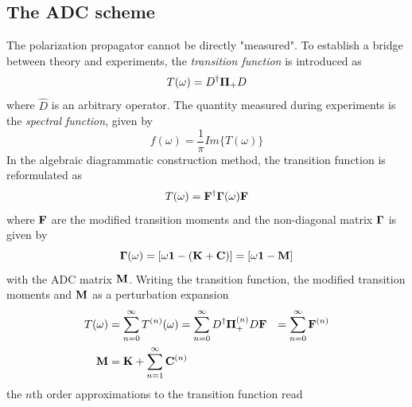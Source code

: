 \subsection{The ADC scheme}

The polarization propagator cannot be directly "measured". To establish a bridge between theory and experiments, the \emph{transition function} is introduced as
\begin{equation}
T(\omega) = D^{\dagger} \boldsymbol{\Pi}_{+} D 
\end{equation}
\noindent where $\hat{D}$ is an arbitrary operator. The quantity measured during experiments is the \emph{spectral function}, given by
\begin{equation}
f(\omega) = \frac{1}{\pi}Im\{T(\omega)\}
\end{equation}
In the algebraic diagrammatic construction method, the transition function is reformulated as
\begin{equation}
T(\omega) = \mathbf{F}^{\dagger} \mathbf{\Gamma}(\omega) \mathbf{F}
\end{equation}
\noindent where $\mathbf{F}$ are the modified transition moments and the non-diagonal matrix $\mathbf{\Gamma}$ is given by
\begin{equation}
\mathbf{\Gamma}(\omega) = \left[ \omega \mathbf{1} - (\mathbf{K} + \mathbf{C}) \right] = \left[ \omega \mathbf{1} - \mathbf{M} \right]
\end{equation}
\noindent with the ADC matrix $\mathbf{M}$. Writing the transition function, the modified transition moments and $\mathbf{M}$ as a perturbation expansion
\begin{align}
T(\omega) &= \sum_{n=0}^{\infty} T^{(n)}(\omega) = \sum_{n=0}^{\infty} D^{\dagger} \boldsymbol{\Pi}_{+}^{(n)} D
\mathbf{F} &= \sum_{n=0}^{\infty} \mathbf{F}^{(n)} \\
\mathbf{M} &= \mathbf{K} + \sum_{n=1}^{\infty} \mathbf{C}^{(n)}
\end{align} 
\noindent the $n$th order approximations to the transition function read
